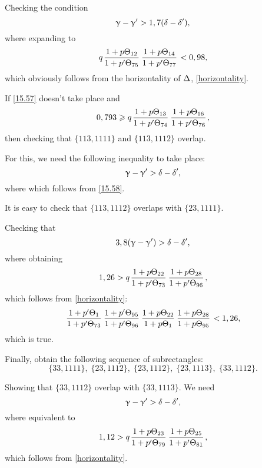 Checking the condition
\begin{equation*}
	\upgamma - \upgamma' > 1,7 (\delta - \delta'),
\end{equation*}
where
expanding to
\begin{equation*}
	q \up{12}{75} \up{14}{77} < 0,98,
\end{equation*}
which obviously follows from the horizontality of $\Delta$, \ref{horizontality}.

If \ref{15.57} doesn't take place and
\begin{equation}\label{15.58}
	0,793 \geqslant q \up{13}{74} \up{16}{76},
\end{equation}
then checking that $\{113, 1111\}$ and $\{113, 1112\}$ overlap.

For this, we need the following inequality to take place:
\begin{equation*}
	\upgamma - \upgamma' > \delta - \delta',
\end{equation*}
where
which follows from \ref{15.58}.

It is easy to check that $\{113, 1112\}$ overlaps with $\{23, 1111\}$.

Checking that
\begin{equation*}
	3,8 (\upgamma - \upgamma') > \delta - \delta',
\end{equation*}
where
obtaining
\begin{equation*}
	1,26 > q \up{22}{73} \up{28}{96},
\end{equation*}
which follows from \ref{horizontality}:
\begin{equation*}
	\pp{1}{73} \pp{95}{96} \uu{22}{1} \uu{28}{95} < 1,26,
\end{equation*}
which is true.

Finally, obtain the following sequence of subrectangles:
\begin{equation*}
	\{33, 1111\},\;
	\{23, 1112\},\;
	\{23, 1112\},\;
	\{23, 1113\},\;
	\{33, 1112\}.
\end{equation*}

Showing that $\{33, 1112\}$ overlap with $\{33, 1113\}$.
We need
\begin{equation*}
	\upgamma - \upgamma' > \delta - \delta',
\end{equation*}
where
equivalent to
\begin{equation*}
	1,12 > q \up{23}{79} \up{25}{81},
\end{equation*}
which follows from \ref{horizontality}.